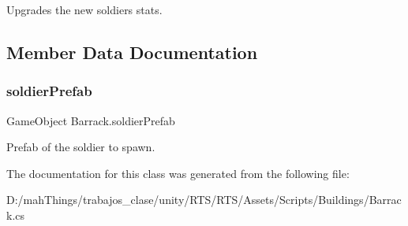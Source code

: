 Upgrades the new soldiers stats. 



\subsection{Member Data Documentation}
\mbox{\label{class_barrack_adf7be62f03920fd2248a35c598b92b2a}} 
\subsubsection{\texorpdfstring{soldier\+Prefab}{soldierPrefab}}
{\footnotesize\ttfamily Game\+Object Barrack.\+soldier\+Prefab}



Prefab of the soldier to spawn. 



The documentation for this class was generated from the following file\+:\begin{DoxyCompactItemize}
\item 
D\+:/mah\+Things/trabajos\+\_\+clase/unity/\+R\+T\+S/\+R\+T\+S/\+Assets/\+Scripts/\+Buildings/Barrack.\+cs\end{DoxyCompactItemize}
